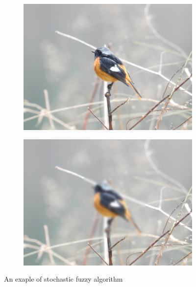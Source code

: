 \begin{figure}[H]
    \centering
    \begin{subfigure}{0.20\textwidth}
        \includegraphics[width=\linewidth]{fuzz_example.jpg}
    \end{subfigure}
    \begin{subfigure}{0.20\textwidth}
        \includegraphics[width=\linewidth]{fuzz_exampleX.jpg}
    \end{subfigure}
    \caption{An exaple of stochastic fuzzy algorithm}
\end{figure}
